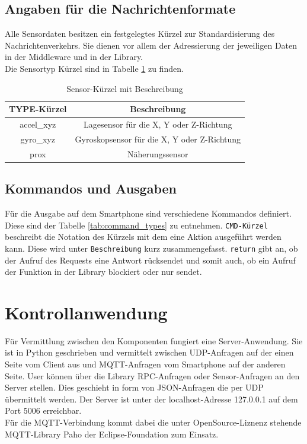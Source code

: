 \documentclass[11pt,a4paper]{report}
\begin{document}
\section{Angaben für die Nachrichtenformate}
Alle Sensordaten besitzen ein festgelegtes Kürzel zur Standardisierung des Nachrichtenverkehrs.
Sie dienen vor allem der Adressierung der jeweiligen Daten in der Middleware und in der Library.
\\
Die Sensortyp Kürzel sind in Tabelle \ref{tab:sensor_types} zu finden. 
\begin{table}[htbp]
  \centering
  \begin{tabular}{|c|c|}
      \hline
      \textbf{TYPE-Kürzel} & \textbf{Beschreibung} \\
      \hline
      accel\_xyz & Lagesensor für die X, Y oder Z-Richtung \\
      \hline
       gyro\_xyz & Gyroskopsensor für die X, Y oder Z-Richtung \\
      \hline
      prox & Näherungssensor \\
      \hline
  \end{tabular}
  \caption{Sensor-Kürzel mit Beschreibung}
  \label{tab:sensor_types}
\end{table}

\section{Kommandos und Ausgaben}
Für die Ausgabe auf dem Smartphone sind verschiedene Kommandos definiert.
Diese sind der Tabelle \ref{tab:command_types} zu entnehmen.
\texttt{CMD-Kürzel} beschreibt die Notation des Kürzels mit dem eine Aktion ausgeführt werden kann.
Diese wird unter \texttt{Beschreibung} kurz zusammengefasst.
\texttt{return} gibt an, ob der Aufruf des Requests eine Antwort rücksendet und somit auch, ob ein Aufruf der Funktion in der Library blockiert oder nur sendet.

\chapter{Kontrollanwendung}\label{chap:server_software}

Für Vermittlung zwischen den Komponenten fungiert eine Server-Anwendung.
Sie ist in Python geschrieben und vermittelt zwischen UDP-Anfragen auf der einen Seite vom Client aus und MQTT-Anfragen vom Smartphone auf der anderen Seite.
User können über die Library RPC-Anfragen oder Sensor-Anfragen an den Server stellen.
Dies geschieht in form von JSON-Anfragen die per UDP übermittelt werden.
Der Server ist unter der localhost-Adresse 127.0.0.1 auf dem Port 5006 erreichbar.
\\
Für die MQTT-Verbindung kommt dabei die unter OpenSource-Liznenz stehende MQTT-Library Paho der Eclipse-Foundation zum Einsatz. \cite{paho}
\end{document}
